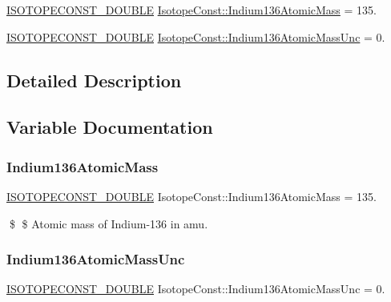 \begin{DoxyCompactItemize}
\item 
\mbox{\hyperlink{group___isotope_const-_macros_ga8f45a7272ce02c0b4c65c44636ed719a}{I\+S\+O\+T\+O\+P\+E\+C\+O\+N\+S\+T\+\_\+\+D\+O\+U\+B\+LE}} \mbox{\hyperlink{group___isotope_const-_indium-_in136_ga79df083de81f4106528c885549c2eccd}{Isotope\+Const\+::\+Indium136\+Atomic\+Mass}} = 135.
\item 
\mbox{\hyperlink{group___isotope_const-_macros_ga8f45a7272ce02c0b4c65c44636ed719a}{I\+S\+O\+T\+O\+P\+E\+C\+O\+N\+S\+T\+\_\+\+D\+O\+U\+B\+LE}} \mbox{\hyperlink{group___isotope_const-_indium-_in136_ga37fd5d1ca0670dfae17550393d3f8c29}{Isotope\+Const\+::\+Indium136\+Atomic\+Mass\+Unc}} = 0.
\end{DoxyCompactItemize}


\subsection{Detailed Description}


\subsection{Variable Documentation}
\mbox{\label{group___isotope_const-_indium-_in136_ga79df083de81f4106528c885549c2eccd}} 
\subsubsection{\texorpdfstring{Indium136\+Atomic\+Mass}{Indium136AtomicMass}}
{\footnotesize\ttfamily \mbox{\hyperlink{group___isotope_const-_macros_ga8f45a7272ce02c0b4c65c44636ed719a}{I\+S\+O\+T\+O\+P\+E\+C\+O\+N\+S\+T\+\_\+\+D\+O\+U\+B\+LE}} Isotope\+Const\+::\+Indium136\+Atomic\+Mass = 135.}

\$ \$ Atomic mass of Indium-\/136 in amu. \mbox{\label{group___isotope_const-_indium-_in136_ga37fd5d1ca0670dfae17550393d3f8c29}} 
\subsubsection{\texorpdfstring{Indium136\+Atomic\+Mass\+Unc}{Indium136AtomicMassUnc}}
{\footnotesize\ttfamily \mbox{\hyperlink{group___isotope_const-_macros_ga8f45a7272ce02c0b4c65c44636ed719a}{I\+S\+O\+T\+O\+P\+E\+C\+O\+N\+S\+T\+\_\+\+D\+O\+U\+B\+LE}} Isotope\+Const\+::\+Indium136\+Atomic\+Mass\+Unc = 0.}


